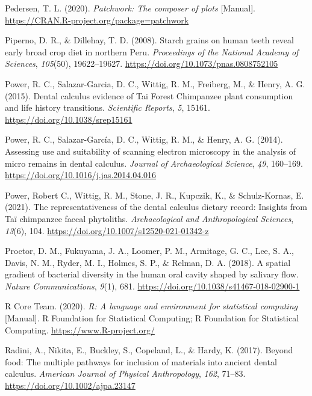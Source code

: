 \documentclass[
  letterpaper,
]{book}
\newlength{\cslhangindent}
\newlength{\cslentryspacingunit} %
\newenvironment{CSLReferences}[2] %
 {%
  \setlength{\parindent}{0pt}
  \ifodd #1
  \let\oldpar\par
  \def\par{\hangindent=\cslhangindent\oldpar}
  \fi
  \setlength{\parskip}{#2\cslentryspacingunit}
 }%
 {}
\begin{document}
\begin{CSLReferences}{1}{0}
\leavevmode{}%
Pedersen, T. L. (2020). \emph{Patchwork: {The} composer of plots}
{[}Manual{]}. \url{https://CRAN.R-project.org/package=patchwork}

\leavevmode{}%
Piperno, D. R., \& Dillehay, T. D. (2008). Starch grains on human teeth
reveal early broad crop diet in northern {Peru}. \emph{Proceedings of
the National Academy of Sciences}, \emph{105}(50), 19622--19627.
\url{https://doi.org/10.1073/pnas.0808752105}

\leavevmode{}%
Power, R. C., Salazar-Garcia, D. C., Wittig, R. M., Freiberg, M., \&
Henry, A. G. (2015). Dental calculus evidence of {Tai Forest Chimpanzee}
plant consumption and life history transitions. \emph{Scientific
Reports}, \emph{5}, 15161. \url{https://doi.org/10.1038/srep15161}

\leavevmode{}%
Power, R. C., Salazar-García, D. C., Wittig, R. M., \& Henry, A. G.
(2014). Assessing use and suitability of scanning electron microscopy in
the analysis of micro remains in dental calculus. \emph{Journal of
Archaeological Science}, \emph{49}, 160--169.
\url{https://doi.org/10.1016/j.jas.2014.04.016}

\leavevmode{}%
Power, Robert C., Wittig, R. M., Stone, J. R., Kupczik, K., \&
Schulz-Kornas, E. (2021). The representativeness of the dental calculus
dietary record: Insights from {Taï} chimpanzee faecal phytoliths.
\emph{Archaeological and Anthropological Sciences}, \emph{13}(6), 104.
\url{https://doi.org/10.1007/s12520-021-01342-z}

\leavevmode{}%
Proctor, D. M., Fukuyama, J. A., Loomer, P. M., Armitage, G. C., Lee, S.
A., Davis, N. M., Ryder, M. I., Holmes, S. P., \& Relman, D. A. (2018).
A spatial gradient of bacterial diversity in the human oral cavity
shaped by salivary flow. \emph{Nature Communications}, \emph{9}(1), 681.
\url{https://doi.org/10.1038/s41467-018-02900-1}

\leavevmode{}%
R Core Team. (2020). \emph{R: {A} language and environment for
statistical computing} {[}Manual{]}. {R Foundation for Statistical
Computing}; {R Foundation for Statistical Computing}.
\url{https://www.R-project.org/}

\leavevmode{}%
Radini, A., Nikita, E., Buckley, S., Copeland, L., \& Hardy, K. (2017).
Beyond food: {The} multiple pathways for inclusion of materials into
ancient dental calculus. \emph{American Journal of Physical
Anthropology}, \emph{162}, 71--83.
\url{https://doi.org/10.1002/ajpa.23147}


\end{CSLReferences}
\end{document}
